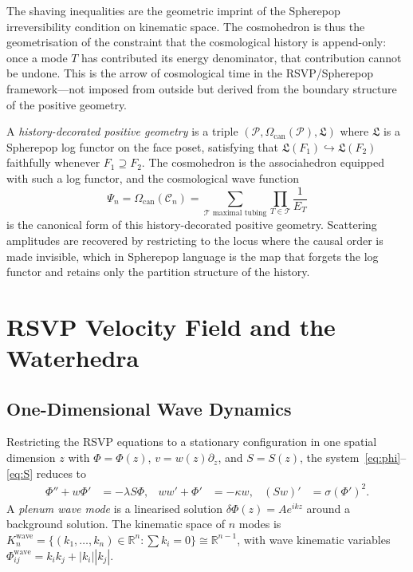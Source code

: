 \documentclass[12pt, oneside]{amsart}
\theoremstyle{plain}
\theoremstyle{definition}
\theoremstyle{remark}
\newcommand{\R}{\mathbb{R}}
\newcommand{\Phif}{\Phi}
\newcommand{\vf}{v}
\newcommand{\Sf}{S}
\newcommand{\Log}{\mathfrak{L}}
\newcommand{\WF}{\Psi}
\newcommand{\Cosmo}{\mathcal{C}_n}
\newcommand{\CF}{\Omega_{\mathrm{can}}}
\begin{document}
The shaving inequalities are the geometric imprint of the Spherepop irreversibility condition on kinematic space. The cosmohedron is thus the geometrisation of the constraint that the cosmological history is append-only: once a mode $T$ has contributed its energy denominator, that contribution cannot be undone. This is the arrow of cosmological time in the RSVP/Spherepop framework---not imposed from outside but derived from the boundary structure of the positive geometry.

A \emph{history-decorated positive geometry} is a triple $(\mathcal{P}, \CF(\mathcal{P}), \Log)$ where $\Log$ is a Spherepop log functor on the face poset, satisfying that $\Log(F_1) \hookrightarrow \Log(F_2)$ faithfully whenever $F_1 \supseteq F_2$. The cosmohedron is the associahedron equipped with such a log functor, and the cosmological wave function
\[
  \WF_n = \CF(\Cosmo) = \sum_{\mathcal{T}\text{ maximal tubing}} \prod_{T \in \mathcal{T}} \frac{1}{E_T}
\]
is the canonical form of this history-decorated positive geometry. Scattering amplitudes are recovered by restricting to the locus where the causal order is made invisible, which in Spherepop language is the map that forgets the log functor and retains only the partition structure of the history.

\section{RSVP Velocity Field and the Waterhedra}
\label{sec:water}

\subsection{One-Dimensional Wave Dynamics}

Restricting the RSVP equations to a stationary configuration in one spatial dimension $z$ with $\Phif = \Phif(z)$, $\vf = w(z)\partial_z$, and $\Sf = \Sf(z)$, the system~\eqref{eq:phi}--\eqref{eq:S} reduces to
\begin{align*}
  \Phif'' + w\Phif' &= -\lambda \Sf\Phif, &
  ww' + \Phif' &= -\kappa w, &
  (\Sf w)' &= \sigma(\Phif')^2.
\end{align*}
A \emph{plenum wave mode} is a linearised solution $\delta\Phif(z) = A e^{ikz}$ around a background solution. The kinematic space of $n$ modes is $K_n^{\mathrm{wave}} = \{(k_1,\ldots,k_n) \in \R^n : \sum k_i = 0\} \cong \R^{n-1}$, with wave kinematic variables $\Phif_{ij}^{\mathrm{wave}} = k_ik_j + |k_i||k_j|$.
\end{document}
